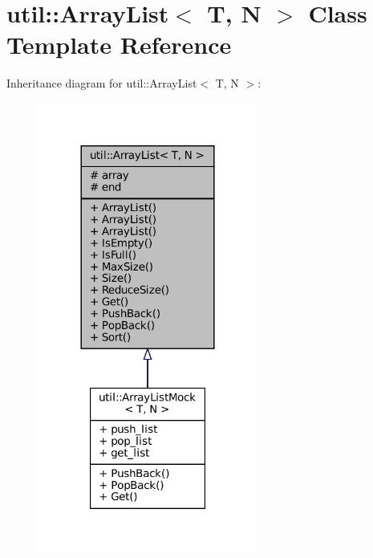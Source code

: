 \hypertarget{classutil_1_1ArrayList}{}\section{util\+:\+:Array\+List$<$ T, N $>$ Class Template Reference}
\label{classutil_1_1ArrayList}


Inheritance diagram for util\+:\+:Array\+List$<$ T, N $>$\+:
\nopagebreak
\begin{figure}[H]
\begin{center}
\leavevmode
\includegraphics[width=204pt]{classutil_1_1ArrayList__inherit__graph}
\end{center}
\end{figure}


